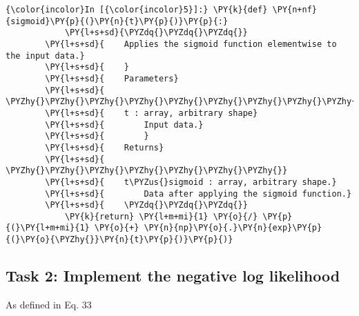     \begin{Verbatim}[commandchars=\\\{\}]
{\color{incolor}In [{\color{incolor}5}]:} \PY{k}{def} \PY{n+nf}{sigmoid}\PY{p}{(}\PY{n}{t}\PY{p}{)}\PY{p}{:}
            \PY{l+s+sd}{\PYZdq{}\PYZdq{}\PYZdq{}}
        \PY{l+s+sd}{    Applies the sigmoid function elementwise to the input data.}
        \PY{l+s+sd}{    }
        \PY{l+s+sd}{    Parameters}
        \PY{l+s+sd}{    \PYZhy{}\PYZhy{}\PYZhy{}\PYZhy{}\PYZhy{}\PYZhy{}\PYZhy{}\PYZhy{}\PYZhy{}\PYZhy{}}
        \PY{l+s+sd}{    t : array, arbitrary shape}
        \PY{l+s+sd}{        Input data.}
        \PY{l+s+sd}{        }
        \PY{l+s+sd}{    Returns}
        \PY{l+s+sd}{    \PYZhy{}\PYZhy{}\PYZhy{}\PYZhy{}\PYZhy{}\PYZhy{}\PYZhy{}}
        \PY{l+s+sd}{    t\PYZus{}sigmoid : array, arbitrary shape.}
        \PY{l+s+sd}{        Data after applying the sigmoid function.}
        \PY{l+s+sd}{    \PYZdq{}\PYZdq{}\PYZdq{}}
            \PY{k}{return} \PY{l+m+mi}{1} \PY{o}{/} \PY{p}{(}\PY{l+m+mi}{1} \PY{o}{+} \PY{n}{np}\PY{o}{.}\PY{n}{exp}\PY{p}{(}\PY{o}{\PYZhy{}}\PY{n}{t}\PY{p}{)}\PY{p}{)}
\end{Verbatim}

    \hypertarget{task-2-implement-the-negative-log-likelihood}{%
\subsection{Task 2: Implement the negative log
likelihood}\label{task-2-implement-the-negative-log-likelihood}}

    As defined in Eq. 33

